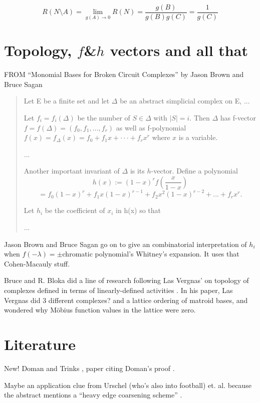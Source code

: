 \documentclass{article}
\begin{document}
\begin{enumerate}
\[
R(N\setminus A) = \lim_{g(A)\rightarrow 0}R(N) = \frac{g(B)}{g(B)g(C)} = \frac{1}{g(C)}
\]


\section{Topology, $f$\&$h$ vectors and all that}

FROM 
``Monomial Bases for Broken Circuit Complexes''
by Jason Brown and  Bruce Sagan
\cite{MonBasesBrkCircCompBrownSagan}
\begin{quote}
Let E be a finite set and let $\Delta$
be an abstract simplicial complex on E, ...

Let $f_i = f_i(\Delta)$ be the number of $S \in \Delta$ with
$|S| = i$. Then $\Delta$ has f-vector
$f = f(\Delta) = (f_0, f_1, . . . , f_r)$
as well as f-polynomial
$f(x) = f_{\Delta}(x) = f_0 + f_1x + · · · + f_rx^r$
where $x$ is a variable. 

...

Another important invariant of $\Delta$ is its $h$-vector. Define a polynomial
\[
h(x) := (1 - x)^r f(\frac{x}{1-x})
\]
\[
= f_0(1 - x)^r + f_1x(1 - x)^{r-1} + f_2x^2(1-x)^{r-2} + ... + f_rx^r. 
\]

Let $h_i$ be the coefficient of $x_i$ in h(x) so that 

...
\end{quote}

Jason Brown and  Bruce Sagan go on to give an combinatorial interpretation
of $h_i$ when $f(-\lambda)=\pm$chromatic polynomial's Whitney's expansion.
It uses that Cohen-Macauly stuff.

Bruce and R. Bloka did a line of research following Las Vergnas' 
\cite{ActOrdersMatrBasesLasVergnas} on 
topology of complexes defined in terms of linearly-defined activities
\cite{ActTopPropBlokaSagan}.  In his paper, 
Las Vergnas did 3 different complexes? 
and a lattice ordering of matroid bases, 
and wondered why M\"{o}bius function values in the lattice were zero.







\section{Literature}

New! Doman and Trinks \cite{DohmenTrinksAbsWitBrok}, paper citing
Doman's proof \cite{DohIndProofMatroids}.

Maybe an application clue from Urschel (who's also into football) et. al.
because the abstract mentions a ``heavy edge coarsening scheme''
\cite{UrschelFiedlerGraphLaplac}.

\end{enumerate}


\end{document}
